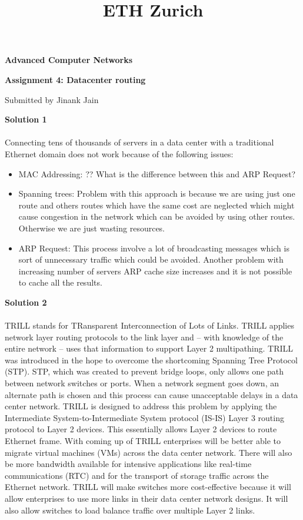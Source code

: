 \documentclass[letterpaper, 11pt]{article}
\title{ETH Zurich}
\begin{document}

\begin{center}
\Large \bf Advanced Computer Networks

\Large \bf Assignment 4: Datacenter routing

\large Submitted by Jinank Jain
\end{center}

\textbf{Solution 1}\\ \\
Connecting tens of thousands of servers in a data center with a traditional Ethernet domain does not work because of the following issues:
\begin{itemize}
\item MAC Addressing: ?? What is the difference between this and ARP Request?
\item Spanning trees: Problem with this approach is because we are using just one route and others routes which have the same cost are neglected which might cause congestion in the network which can be avoided by using other routes. Otherwise we are just wasting resources.
\item ARP Request: This process involve a lot of broadcasting messages which is sort of unnecessary traffic which could be avoided. Another problem with increasing number of servers ARP cache size increases and it is not possible to cache all the results.
\end{itemize}
\bigskip

\textbf{Solution 2}\\ \\
TRILL  stands for TRansparent Interconnection of Lots of Links. TRILL applies network layer routing protocols to the link layer and -- with knowledge of the entire network -- uses that information to support Layer 2 multipathing. TRILL was introduced in the hope to overcome the shortcoming Spanning Tree Protocol (STP). STP, which was created to prevent bridge loops, only allows one path between network switches or ports. When a network segment goes down, an alternate path is chosen and this process can cause unacceptable delays in a data center network. TRILL is designed to address this problem by applying the Intermediate System-to-Intermediate System protocol (IS-IS) Layer 3 routing protocol to Layer 2 devices. This essentially allows Layer 2 devices to route Ethernet frame. With coming up of TRILL enterprises will be better able to migrate virtual machines (VMs) across the data center network. There will also be more bandwidth available for intensive applications like real-time communications (RTC) and for the transport of storage traffic across the Ethernet network. TRILL will make switches more cost-effective because it will allow enterprises to use more links in their data center network designs. It will also allow switches to load balance traffic over multiple Layer 2 links.
\bigskip
\end{document}
